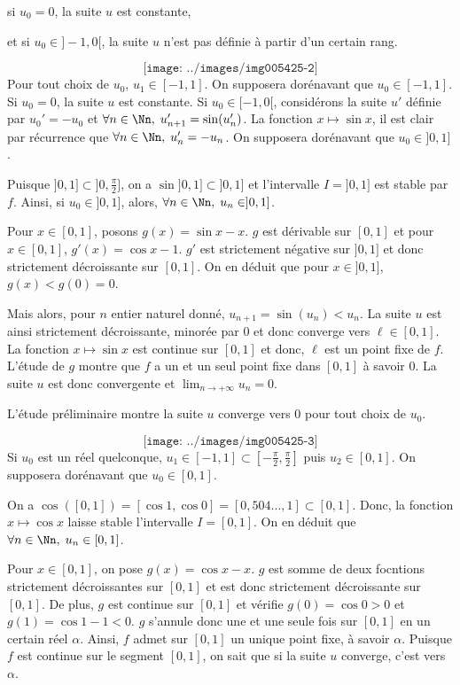 {{si $u_0=0$, la suite $u$ est constante,

et si $u_0\in]-1,0[$, la suite $u$ n'est pas définie à partir d'un certain rang.

$$\texttt{[image: ../images/img005425-2]}$$
Pour tout choix de $u_0$, $u_1\in[-1,1]$. On supposera dorénavant que $u_0\in[-1,1]$. Si $u_0=0$, la suite $u$ est constante. Si $u_0\in[-1,0[$, considérons la suite $u'$ définie par $u_0'=-u_0$ et $\forall n\in\Nn,\;u_{n+1}'=\sin(u_n')$. La fonction $x\mapsto\sin x$, il est clair par récurrence que $\forall n\in\Nn,\;u_n'=-u_n$. On supposera dorénavant que $u_0\in]0,1]$.

Puisque $]0,1]\subset]0,\frac{\pi}{2}]$, on a $\sin]0,1]\subset]0,1]$ et l'intervalle $I=]0,1]$ est stable par $f$. Ainsi, si $u_0\in]0,1]$, alors, $\forall n\in\Nn,\;u_n\in]0,1]$.

Pour $x\in[0,1]$, posons $g(x)=\sin x-x$. $g$ est dérivable sur $[0,1]$ et pour $x\in[0,1]$, $g'(x)=\cos x-1$. $g'$ est strictement négative sur $]0,1]$ et donc strictement décroissante sur $[0,1]$. On en déduit que pour $x\in]0,1]$, $g(x)<g(0)=0$.

Mais alors, pour $n$ entier naturel donné, $u_{n+1}=\sin(u_n)<u_n$. La suite $u$ est ainsi strictement décroissante, minorée par $0$ et donc converge vers $\ell\in[0,1]$. La fonction $x\mapsto\sin x$ est continue sur $[0,1]$ et donc, $\ell$ est un point fixe de $f$. L'étude de $g$ montre que $f$ a un et un seul point fixe dans $[0,1]$ à savoir $0$. La suite $u$ est donc convergente et $\lim_{n\rightarrow +\infty}u_n=0$.

L'étude préliminaire montre la suite $u$ converge vers $0$ pour tout choix de $u_0$.

$$\texttt{[image: ../images/img005425-3]}$$
Si $u_0$ est un réel quelconque, $u_1\in[-1,1]\subset[-\frac{\pi}{2},\frac{\pi}{2}]$ puis $u_2\in[0,1]$. On supposera dorénavant que $u_0\in[0,1]$.

On a $\cos([0,1])=[\cos 1,\cos0]=[0,504...,1]\subset[0,1]$. Donc, la fonction $x\mapsto\cos x$ laisse stable l'intervalle $I=[0,1]$. On en déduit que $\forall n\in\Nn,\;u_n\in[0,1]$.

Pour $x\in[0,1]$, on pose $g(x)=\cos x-x$. $g$ est somme de deux focntions strictement décroissantes sur $[0,1]$ et est donc strictement décroissante sur $[0,1]$. De plus, $g$ est continue sur $[0,1]$ et vérifie $g(0)=\cos0>0$ et $g(1)=\cos1-1<0$. $g$ s'annule donc une et une seule fois sur $[0,1]$ en un certain réel $\alpha$. Ainsi, $f$ admet sur $[0,1]$ un unique point fixe, à savoir $\alpha$. Puisque $f$ est continue sur le segment $[0,1]$, on sait que si la suite $u$ converge, c'est vers $\alpha$.

}}

